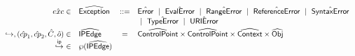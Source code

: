 \[\begin{array}{rlcl}
\hat{exc}\in& \abs{Exception} & ::= & \hat{\exc{Error}} ~\mid~ 
                                      \hat{\exc{EvalError}} ~\mid~
                                      \hat{\exc{RangeError}} ~\mid~
                                      \hat{\exc{ReferenceError}} ~\mid~
                                      \hat{\exc{SyntaxError}} \\
                                & & & ~\mid~
                                      \hat{\exc{TypeError}} ~\mid~ 
                                      \hat{\exc{URIError}} \vspace{1mm}\\

\cfgnext, (\hat{cp}_1, \hat{cp}_2, \hat{C}, \hat{o}) \in & \abs{IPEdge} & = & 
    \aControlPoint \times \aControlPoint \times \abs{Context} \times \abs{Obj} \\
\ipnext\ \in & \powerset{\abs{IPEdge}} & & \\

\end{array}
\]

\newpage
